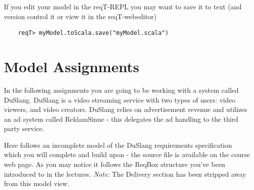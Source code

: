 \documentclass[11pt]{article}
\begin{document}
\begin{enumerate}
\begin{framed}
\noindent If you edit your model in the reqT-REPL you may want to save it to text (and version control it or view it in the reqT-webeditor)
{
    \footnotesize\begin{verbatim}
    reqT> myModel.toScala.save("myModel.scala")
    \end{verbatim}
}
\end{framed}
\end{enumerate}

%
%
\section{Model Assignments}\label{section:mandatoryAssignments}

In the following assignments you are going to be working with a system called DuSlang. DuSlang is a video streaming service with two types of users: video viewers, and video creators. DuSlang relies on advertisement revenue and utilizes an ad system called ReklamSinne - this delegates the ad handling to the third party service.

Here follows an incomplete model of the DuSlang requirements specification which you will complete and build upon - the source file is available on the course web page. As you may notice it follows the ReqBox structure you've been introduced to in the lectures. \textit{Note:} The Delivery section has been stripped away from this model view.
\end{document}
